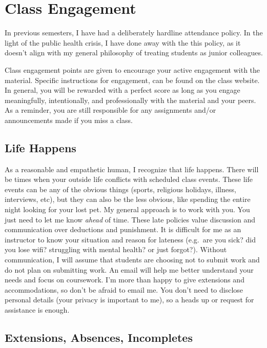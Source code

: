 \documentclass[
]{book}
\begin{document}
\hypertarget{class-engagement}{%
\chapter{Class Engagement}\label{class-engagement}}

In previous semesters, I have had a deliberately hardline attendance policy.
In the light of the public health crisis, I have done away with the this policy, as it doesn't align with my general philosophy of treating students as junior colleagues.

Class engagement points are given to encourage your active engagement with the material.
Specific instructions for engagement, can be found on the class website. In general, you will be rewarded with a perfect score as long as you engage meaningfully, intentionally, and professionally with the material and your peers. As a reminder, you are still responsible for any assignments and/or announcements made if you miss a class.

\hypertarget{life-happens}{%
\section{Life Happens}\label{life-happens}}

As a reasonable and empathetic human, I recognize that life happens.
There will be times when your outside life conflicts with scheduled class events.
These life events can be any of the obvious things (sports, religious holidays, illness, interviews, etc), but they can also be the less obvious, like spending the entire night looking for your lost pet.
My general approach is to work with you. You just need to let me know \emph{ahead} of time.
These late policies value discussion and communication over deductions and punishment.
It is difficult for me as an instructor to know your situation and reason for lateness (e.g.~are you sick? did you lose wifi? struggling with mental health? or just forgot?).
Without communication, I will assume that students are choosing not to submit work and do not plan on submitting work.
An email will help me better understand your needs and focus on coursework.
I'm more than happy to give extensions and accommodations, so don't be afraid to email me.
You don't need to disclose personal details (your privacy is important to me), so a heads up or request for assistance is enough.

\hypertarget{extensions-absences-incompletes}{%
\section{Extensions, Absences, Incompletes}\label{extensions-absences-incompletes}}
\end{document}
